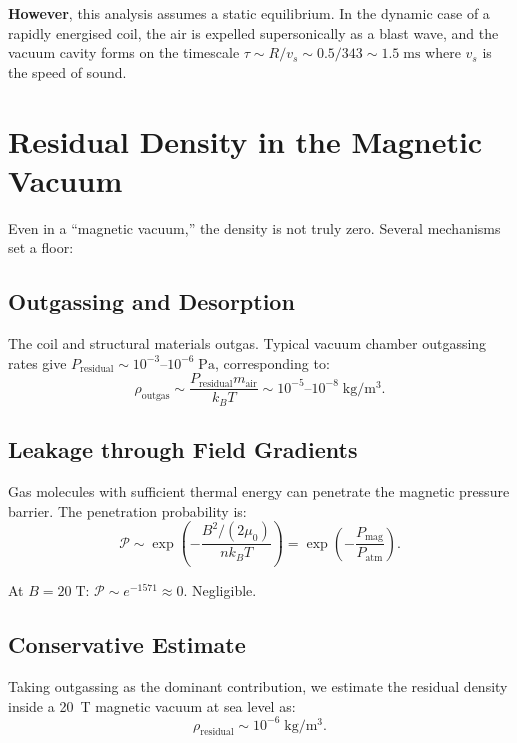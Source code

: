 \documentclass[11pt,a4paper]{article}
\begin{document}
\textbf{However}, this analysis assumes a static equilibrium. In the dynamic case
of a rapidly energised coil, the air is expelled supersonically as a blast wave,
and the vacuum cavity forms on the timescale $\tau \sim R/v_s \sim 0.5/343 \sim 1.5\;\mathrm{ms}$
where $v_s$ is the speed of sound.

\section{Residual Density in the Magnetic Vacuum}\label{sec:residual}

Even in a ``magnetic vacuum,'' the density is not truly zero. Several mechanisms
set a floor:

\subsection{Outgassing and Desorption}

The coil and structural materials outgas. Typical vacuum chamber outgassing rates
give $P_{\mathrm{residual}} \sim 10^{-3}$--$10^{-6}\;\mathrm{Pa}$, corresponding to:
\begin{equation}
\rho_{\mathrm{outgas}} \sim \frac{P_{\mathrm{residual}} m_{\mathrm{air}}}{k_B T}
\sim 10^{-5}\text{--}10^{-8}\;\mathrm{kg/m^3}.
\end{equation}

\subsection{Leakage through Field Gradients}

Gas molecules with sufficient thermal energy can penetrate the magnetic pressure
barrier. The penetration probability is:
\begin{equation}
\mathcal{P} \sim \exp\!\left(-\frac{B^2/(2\mu_0)}{n k_B T}\right)
= \exp\!\left(-\frac{P_{\mathrm{mag}}}{P_{\mathrm{atm}}}\right).
\end{equation}

At $B = 20\;\mathrm{T}$: $\mathcal{P} \sim e^{-1571} \approx 0$. Negligible.

\subsection{Conservative Estimate}

Taking outgassing as the dominant contribution, we estimate the residual density
inside a 20~T magnetic vacuum at sea level as:
\begin{equation}
\rho_{\mathrm{residual}} \sim 10^{-6}\;\mathrm{kg/m^3}.
\end{equation}
\end{document}
